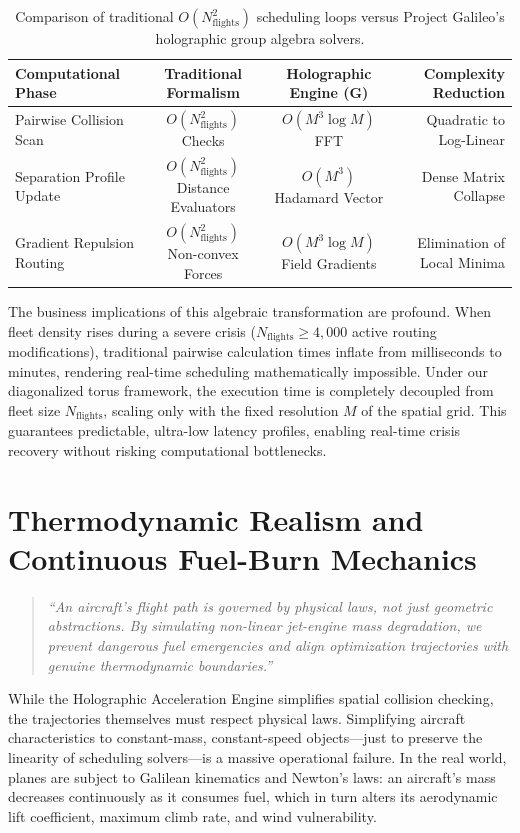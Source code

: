 \documentclass[11pt,a4paper]{book}
\begin{document}
\begin{table}[htbp]
\centering
\begin{tabular}{|l|c|c|r|}
\hline
\textbf{Computational Phase} & \textbf{Traditional Formalism} & \textbf{Holographic Engine (G)} & \textbf{Complexity Reduction} \\ \hline
Pairwise Collision Scan & $O(N_{\text{flights}}^2)$ Checks & $O(M^3 \log M)$ FFT & Quadratic to Log-Linear \\
Separation Profile Update & $O(N_{\text{flights}}^2)$ Distance Evaluators & $O(M^3)$ Hadamard Vector & Dense Matrix Collapse \\
Gradient Repulsion Routing & $O(N_{\text{flights}}^2)$ Non-convex Forces & $O(M^3 \log M)$ Field Gradients & Elimination of Local Minima \\ \hline
\end{tabular}
\caption{Comparison of traditional $O(N_{\text{flights}}^2)$ scheduling loops versus Project Galileo's holographic group algebra solvers.}
\label{tab:complexity_comparison}
\end{table}

The business implications of this algebraic transformation are profound. When fleet density rises during a severe crisis ($N_{\text{flights}} \ge 4,000$ active routing modifications), traditional pairwise calculation times inflate from milliseconds to minutes, rendering real-time scheduling mathematically impossible. Under our diagonalized torus framework, the execution time is completely decoupled from fleet size $N_{\text{flights}}$, scaling only with the fixed resolution $M$ of the spatial grid. This guarantees predictable, ultra-low latency profiles, enabling real-time crisis recovery without risking computational bottlenecks.

\section{Thermodynamic Realism and Continuous Fuel-Burn Mechanics}\label{sec:thermodynamic_realism}
\begin{quote}
    \textit{``An aircraft's flight path is governed by physical laws, not just geometric abstractions. By simulating non-linear jet-engine mass degradation, we prevent dangerous fuel emergencies and align optimization trajectories with genuine thermodynamic boundaries.''}
\end{quote}

While the Holographic Acceleration Engine simplifies spatial collision checking, the trajectories themselves must respect physical laws. Simplifying aircraft characteristics to constant-mass, constant-speed objects---just to preserve the linearity of scheduling solvers---is a massive operational failure. In the real world, planes are subject to Galilean kinematics and Newton's laws: an aircraft's mass decreases continuously as it consumes fuel, which in turn alters its aerodynamic lift coefficient, maximum climb rate, and wind vulnerability.
\end{document}
